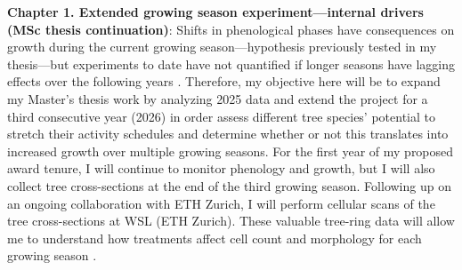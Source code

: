 \documentclass[12pt]{article}
\begin{document}
\textbf{Chapter 1. Extended growing season experiment---internal drivers (MSc thesis continuation)}:
Shifts in phenological phases have consequences on growth during the current growing season---hypothesis previously tested in my thesis---but experiments to date have not quantified if longer seasons have lagging effects over the following years \cite{chapin_ecology_1990,landhausser_partitioning_2012,lawrence_variable_2018,martens_first-year_2007,schott_premature_2013}. Therefore, my objective here will be to expand my Master's thesis work by analyzing 2025 data and extend the project for a third consecutive year (2026) in order assess different tree species’ potential to stretch their activity schedules and determine whether or not this translates into increased growth over multiple growing seasons. For the first year of my proposed award tenure, I will continue to monitor phenology and growth, but I will also collect tree cross-sections at the end of the third growing season. Following up on an ongoing collaboration with ETH Zurich, I will perform cellular scans of the tree cross-sections at WSL (ETH Zurich). These valuable tree-ring data will allow me to understand how treatments affect cell count and morphology for each growing season \cite{silvestro_longer_2023}. 
\end{document}
